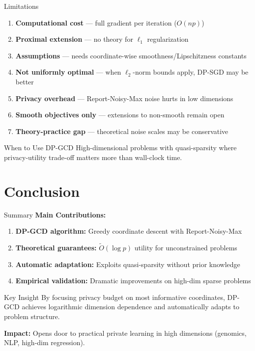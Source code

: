 \documentclass{beamer}
\begin{document}
\begin{frame}{Limitations}
\begin{enumerate}
\item \textbf{Computational cost} — full gradient per iteration ($O(np)$)
\item \textbf{Proximal extension} — no theory for $\ell_1$ regularization
\item \textbf{Assumptions} — needs coordinate-wise smoothness/Lipschitzness constants
\item \textbf{Not uniformly optimal} — when $\ell_2$-norm bounds apply, DP-SGD may be better
\item \textbf{Privacy overhead} — Report-Noisy-Max noise hurts in low dimensions
\item \textbf{Smooth objectives only} — extensions to non-smooth remain open
\item \textbf{Theory-practice gap} — theoretical noise scales may be conservative
\end{enumerate}

\vspace{1em}

\begin{block}{When to Use DP-GCD}
High-dimensional problems with quasi-sparsity where privacy-utility trade-off matters more than wall-clock time.
\end{block}
\end{frame}

\section{Conclusion}

\begin{frame}{Summary}
\textbf{Main Contributions:}
\begin{enumerate}
\item \textbf{DP-GCD algorithm:} Greedy coordinate descent with Report-Noisy-Max
\item \textbf{Theoretical guarantees:} $\widetilde{O}(\log p)$ utility for unconstrained problems
\item \textbf{Automatic adaptation:} Exploits quasi-sparsity without prior knowledge
\item \textbf{Empirical validation:} Dramatic improvements on high-dim sparse problems
\end{enumerate}

\vspace{1em}

\begin{block}{Key Insight}
By focusing privacy budget on most informative coordinates, DP-GCD achieves logarithmic dimension dependence and automatically adapts to problem structure.
\end{block}

\vspace{1em}

\textbf{Impact:} Opens door to practical private learning in high dimensions (genomics, NLP, high-dim regression).
\end{frame}
\end{document}
